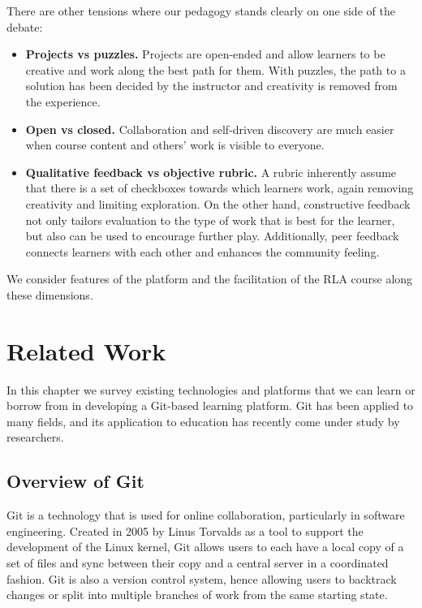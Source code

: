 \documentclass[12pt,twoside,vi]{mitthesis}
\begin{document}
There are other tensions where our pedagogy stands clearly on one side of the debate:
\begin{itemize}
\item \textbf{Projects vs puzzles.} Projects are open-ended and allow learners to be creative and work along the best path for them. With puzzles, the path to a solution has been decided by the instructor and creativity is removed from the experience.
\item \textbf{Open vs closed.} Collaboration and self-driven discovery are much easier when course content and others' work is visible to everyone.
\item \textbf{Qualitative feedback vs objective rubric.} A rubric inherently assume that there is a set of checkboxes towards which learners work, again removing creativity and limiting exploration. On the other hand, constructive feedback not only tailors evaluation to the type of work that is best for the learner, but also can be used to encourage further play. Additionally, peer feedback connects learners with each other and enhances the community feeling.
\end{itemize}
We consider features of the platform and the facilitation of the RLA course along these dimensions.

\chapter{Related Work}

In this chapter we survey existing technologies and platforms that we can learn or borrow from in developing a Git-based learning platform. Git has been applied to many fields, and its application to education has recently come under study by researchers.

\section{Overview of Git}

Git is a technology that is used for online collaboration, particularly in software engineering. Created in 2005 by Linus Torvalds as a tool to support the development of the Linux kernel, Git allows users to each have a local copy of a set of files and sync between their copy and a central server in a coordinated fashion. Git is also a version control system, hence allowing users to backtrack changes or split into multiple branches of work from the same starting state.~\cite{githistory}
\end{document}
